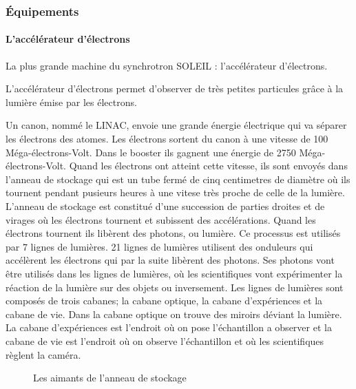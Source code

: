 		\subsubsection{Équipements}
			
			\paragraph{L'accélérateur d'électrons}
				La plus grande machine du synchrotron SOLEIL : l'accélérateur d'électrons.
				
				L'accélérateur d'électrons permet d'observer de très petites particules grâce à la lumière émise par les électrons.
				
				Un canon, nommé le LINAC, envoie une grande énergie électrique qui va séparer les électrons des atomes. Les électrons sortent du canon à une vitesse de 100 Méga-électrons-Volt.  Dans le booster ils gagnent une énergie de 2750 Méga-électrons-Volt. Quand les électrons ont atteint cette vitesse, ils sont envoyés dans l'anneau de stockage qui est un tube fermé de cinq centimetres de diamètre où ils tournent pendant pusieurs heures à une vitese très proche de celle de la lumière. L'anneau de stockage est constitué d'une succession de parties droites et de virages où les électrons tournent et subissent des accélérations. Quand les électrons tournent ils libèrent des photons, ou lumière. Ce processus est utilisés par 7 lignes de lumières. 21 lignes de lumières utilisent des onduleurs qui accélèrent les électrons qui par la suite libèrent des photons. Ses photons vont être utilisés dans les lignes de lumières, où les scientifiques vont expérimenter la réaction de la lumière sur des objets ou inversement. Les lignes de lumières sont composés de trois cabanes; la cabane optique, la cabane d'expériences et la cabane de vie. Dans la cabane optique on trouve des miroirs déviant la lumière. La cabane d'expériences est l'endroit où on pose l'échantillon a observer et la cabane de vie est l'endroit où on observe l'échantillon et où les scientifiques règlent la caméra. 
			\begin{figure}
 				 \centering
 				 \caption{Les aimants de l'anneau de stockage}
				\end{figure}

